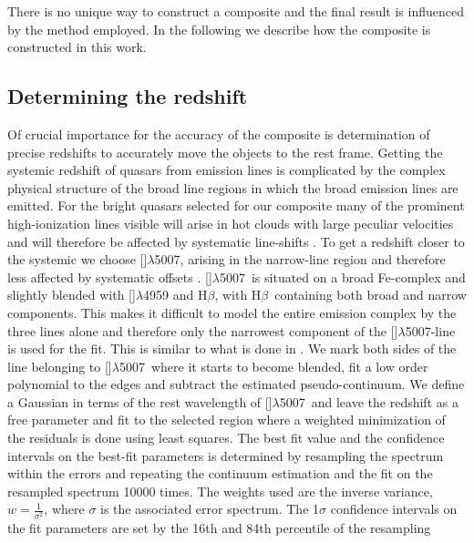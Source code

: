 \documentclass{aa}    %
\newcommand{\sectlabel}[1]{\label{sect:#1}}
\newcommand{\hb}{H$\beta$}
\newcommand{\oiii}{[\ion{O}{iii}]$\lambda$5007}
\begin{document}
There is no unique way to construct a composite and the final result is
influenced by the method employed. In the following we describe how the
composite is constructed in this work.

\subsection{Determining the redshift}  \sectlabel{redshifts}

Of crucial importance for the accuracy of the composite is
determination of precise redshifts to accurately move the objects to
the rest frame. Getting the systemic redshift of quasars from emission
lines is complicated by the complex physical structure of the broad
line regions in which the broad emission lines are emitted. For the
bright quasars selected for our composite many of the prominent
high-ionization lines visible will arise in hot clouds with large
peculiar velocities and will therefore be affected by systematic
line-shifts \citep{Tytler1992, Richards2002b, Gaskell2013}. To get a
redshift closer to the systemic we choose \oiii, arising in the
narrow-line region and therefore less affected by systematic offsets
\citep{Hewett2010}. \oiii~is situated on a broad Fe-complex and
slightly blended with []$\lambda$4959 and \hb, with \hb~containing both broad and narrow components.  
This makes it difficult to
model the entire emission complex by the three lines alone and
therefore only the narrowest component of the \oiii-line is used for
the fit. This is similar to what is done in \citet{VandenBerk2001}.
We mark both sides of the line belonging to
\oiii~where it starts to become blended, fit a low order polynomial
to the edges and subtract the estimated pseudo-continuum.
We define a Gaussian in terms of the rest wavelength of \oiii~and
leave the redshift as a free parameter and fit to the selected
region where a weighted minimization of the residuals is done using
least squares. The best fit value and the confidence intervals on the
best-fit parameters is determined by resampling the spectrum within
the errors and repeating the continuum estimation and the fit on the
resampled spectrum 10000 times. The weights used are the inverse
variance, $ w = \frac{1}{\sigma^2}$, where $\sigma$ is the associated
error spectrum. The 1$\sigma$ confidence intervals on the fit
parameters are set by the 16th and 84th percentile of the resampling
\end{document}
